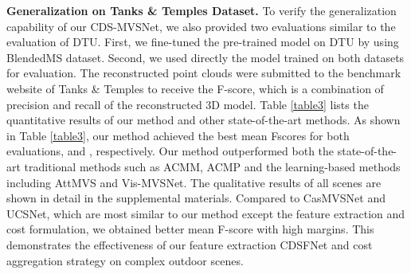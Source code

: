 \documentclass{article} \usepackage{iclr2022_conference,times}
\begin{document}
\textbf{Generalization on Tanks \& Temples Dataset.} To verify the generalization capability of our CDS-MVSNet, we also provided two evaluations similar to the evaluation of DTU. First, we fine-tuned the pre-trained model on DTU by using BlendedMS dataset. Second, we used directly the model trained on both datasets for evaluation. The reconstructed point clouds were submitted to the benchmark website of Tanks \& Temples \citep{knapitsch2017tanks} to receive the F-score, which is a combination of precision and recall of the reconstructed 3D model. Table \ref{table3} lists the quantitative results of our method and other state-of-the-art methods. As shown in Table \ref{table3}, our method achieved the best mean Fscores for both evaluations,  and , respectively. Our method outperformed both the state-of-the-art traditional methods such as ACMM, ACMP and the learning-based methods including AttMVS and Vis-MVSNet. The qualitative results of all scenes are shown in detail in the supplemental materials. Compared to CasMVSNet and UCSNet, which are most similar to our method except the feature extraction and cost formulation, we obtained better mean F-score with high margins. This demonstrates the effectiveness of our feature extraction CDSFNet and cost aggregation strategy on complex outdoor scenes.
\end{document}
